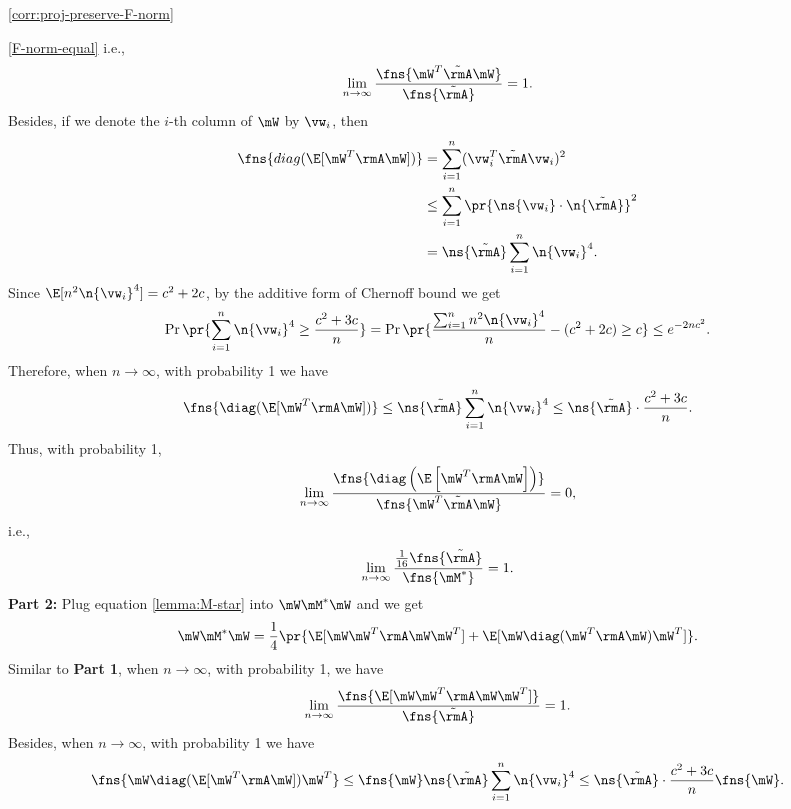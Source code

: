 \begin{proofof}{\cref{corr:proj-preserve-F-norm}}
\begin{proofof}{\cref{F-norm-equal}}
i.e.,
\begin{equation}
    \lim_{n\to\infty}\frac{\fns{\mW^T\tilde{\rmA}\mW}}{\fns{\tilde{\rmA}}}=1.
\end{equation}
Besides, if we denote the $i$-th column of $\mW$ by $\vw_i$, then
\begin{equation}
\begin{split}
\fns{diag(\E[\mW^T\rmA\mW])} &= \sum_{i=1}^n (\vw_i^T\tilde{\rmA}\vw_i)^2\\
                      &\leq \sum_{i=1}^n \pr{\ns{\vw_i}\cdot\n{\tilde{\rmA}}}^2\\
                      &= \ns{\tilde{\rmA}}\sum_{i=1}^n \n{\vw_i}^4.
\end{split}
\end{equation}
Since $\E[n^2\n{\vw_i}^4]=c^2+2c$, by the additive form of Chernoff bound we get
\begin{equation}
\Pr\pr{\sum_{i=1}^n\n{\vw_i}^4\geq \frac{c^2+3c}{n}}=\Pr\pr{\frac{\sum_{i=1}^nn^2\n{\vw_i}^4}{n}-(c^2+2c)\geq c}\leq e^{-2nc^2}.
\end{equation}
Therefore, when $n\to\infty$, with probability 1 we have
\begin{equation}
\fns{\diag(\E[\mW^T\rmA\mW])}\leq \ns{\tilde{\rmA}}\sum_{i=1}^n \n{\vw_i}^4\leq \ns{\tilde{\rmA}}\cdot\frac{c^2+3c}{n}.
\end{equation}
Thus, with probability 1,
\begin{equation}
\label{lemma:W-diag-neg}
\lim_{n\to\infty}\frac{\fns{\diag\left(\E\left[\mW^T\rmA\mW\right]\right)}}{\fns{\mW^T\tilde{\rmA}\mW}} = 0,
\end{equation}
i.e.,
\begin{equation}
\lim_{n\to\infty}\frac{\frac{1}{16}\fns{\tilde{\rmA}}}{\fns{\mM^*}} = 1.
\end{equation}
\textbf{Part 2:} Plug equation \cref{lemma:M-star} into $\mW\mM^*\mW$ and we get
\begin{equation}
\mW\mM^*\mW = \frac14\pr{\E[\mW\mW^T\rmA\mW\mW^T]+\E[\mW \diag(\mW^T\rmA\mW)\mW^T]}.
\end{equation}
Similar to \textbf{Part 1}, when $n\to\infty$, with probability 1, we have
\begin{equation}
\lim_{n\to\infty}\frac{\fns{\E[\mW\mW^T\rmA\mW\mW^T]}}{\fns{\tilde{\rmA}}} = 1.
\end{equation}
Besides, when $n\to\infty$, with probability 1 we have
\begin{equation}
\fns{\mW\diag(\E[\mW^T\rmA\mW])\mW^T}\leq \fns{\mW}\ns{\tilde{\rmA}}\sum_{i=1}^n \n{\vw_i}^4\leq \ns{\tilde{\rmA}}\cdot\frac{c^2+3c}{n}\fns{\mW}.

\end{equation}
\end{proofof}
\end{proofof}
